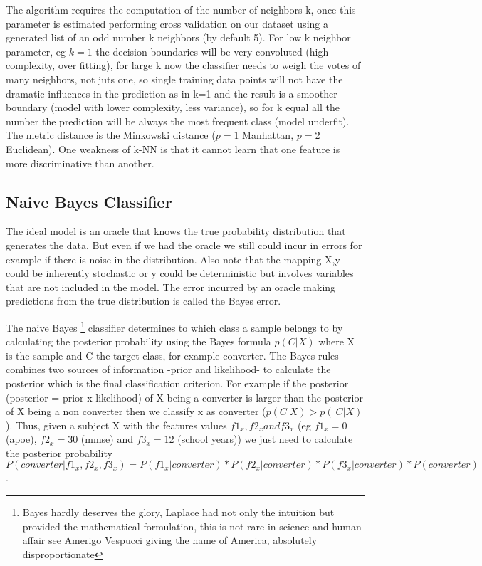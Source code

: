 \documentclass[11pt]{article}
\begin{document}
The algorithm requires the computation of the number of neighbors k, once this parameter is estimated performing cross validation on our dataset using a generated list of an odd number k neighbors (by default 5). For low k neighbor parameter, eg $k=1$ the decision boundaries will be very convoluted (high complexity, over fitting), for large k now the classifier needs to weigh the votes of many neighbors, not juts one, so single training data points will not have the dramatic influences in the prediction as in k=1 and the result is a smoother boundary (model with lower complexity, less variance), so for k equal all the number the prediction will be always the most frequent class (model underfit). The metric distance is the Minkowski distance ($p=1$ Manhattan, $p=2$ Euclidean). 
One weakness of k-NN  is that it cannot learn that one feature is more discriminative than another.

\subsection{Naive Bayes Classifier}
The ideal model is an oracle that knows the true probability distribution that generates the data. But even if we had the oracle we still could incur in errors for example if there is noise in the distribution.
Also note that the mapping X,y could be inherently stochastic  or y could be deterministic but involves variables that are not included in the model. The error incurred by an oracle making predictions from the true distribution is called the Bayes error.

The naive Bayes \footnote{Bayes hardly deserves the glory, Laplace had not only the intuition but provided the mathematical formulation, this is not rare in science and human affair see Amerigo Vespucci giving the name of America, absolutely disproportionate} classifier determines to which class a sample belongs to by calculating the posterior probability using the Bayes formula $p(C|X)$ where X is the sample and C the target class, for example converter.
The Bayes rules combines two sources of information -prior and likelihood- to calculate the posterior which is the final classification criterion.
For example if the posterior (posterior = prior x likelihood) of X being a converter is larger than the posterior of X being a non converter then we classify x as converter ($p(C|X) > p(~C|X)$). Thus, given a subject X with the features values $f1_x, f2_x and f3_x$ (eg $f1_x=0$ (apoe), $f2_x=30$ (mmse) and $f3_x=12$ (school years)) we just need to calculate 
the posterior probability $P(converter|f1_x, f2_x, f3_x) = P(f1_x|converter) * P(f2_x|converter) * P(f3_x|converter) * P(converter)$.
\end{document}
